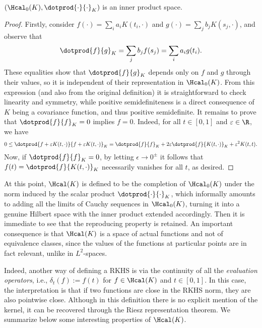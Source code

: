 \begin{proposition} \((\Hcal_0(K), \dotprod{\cdot}{\cdot}_K)\) is an inner product space.
\end{proposition}
  \begin{proof}
    Firstly, consider \(f(\cdot)=\sum_i a_i K(t_i, \cdot) \) and \(g(\cdot)=\sum_j b_j K(s_j, \cdot)\), and observe that
    \[
      \dotprod{f}{g}_K = \sum_j b_j f(s_j) = \sum_i a_i g(t_i).
    \]
    These equalities show that \(\dotprod{f}{g}_K\) depends only on \(f\) and \(g\) through their values, so it is independent of their representation in \(\Hcal_0(K)\). From this expression (and also from the original definition) it is straightforward to check linearity and symmetry, while positive semidefiniteness is a direct consequence of \(K\) being a covariance function, and thus positive semidefinite. It remains to prove that \(\dotprod{f}{f}_K=0\) implies \(f=0\). Indeed, for all \(t\in[0,1]\) and \(\epsilon \in \R\), we have
    \[
    0 \leq \dotprod{f + \epsilon K(t, \cdot)}{f + \epsilon K(t, \cdot)}_K = \dotprod{f}{f}_K + 2\epsilon\dotprod{f}{K(t, \cdot)}_K + \epsilon^2 K(t, t).
    \]
    Now, if \(\dotprod{f}{f}_K=0\), by letting \(\epsilon\to 0^{\pm}\) it follows that \(f(t)=\dotprod{f}{K(t, \cdot)}_K\) necessarily vanishes for all \(t\), as desired.
  \end{proof}

At this point, \(\Hcal(K)\) is defined to be the completion of \(\Hcal_0(K)\) under the norm induced by the scalar product \(\dotprod{\cdot}{\cdot}_K\), which informally amounts to adding all the limits of Cauchy sequences in \(\Hcal_0(K)\), turning it into a genuine Hilbert space with the inner product extended accordingly. Then it is immediate to see that the reproducing property is retained. An important consequence is that \(\Hcal(K)\) is a space of actual functions and not of equivalence classes, since the values of the functions at particular points are in fact relevant, unlike in \(L^2\)-spaces.

Indeed, another way of defining a RKHS is via the continuity of all the \textit{evaluation operators}, i.e., \(\delta_t(f) := f(t)\) for \(f\in\Hcal(K)\) and \(t\in[0,1]\). In this case, the interpretation is that if two functions are close in the RKHS norm, they are also pointwise close. Although in this definition there is no explicit mention of the kernel, it can be recovered through the Riesz representation theorem. We summarize below some interesting properties of \(\Hcal(K)\).


